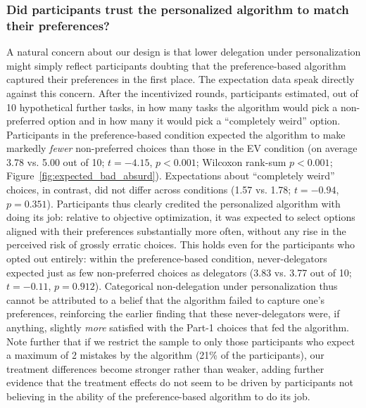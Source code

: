 \documentclass[a4paper, 12pt, fleqn]{article}
\theoremstyle{definition}
\begin{document}
\subsubsection*{Did participants trust the personalized algorithm to match their preferences?}
A natural concern about our design is that lower delegation under personalization might simply reflect participants doubting that the preference-based algorithm captured their preferences in the first place. The expectation data speak directly against this concern. After the incentivized rounds, participants estimated, out of 10 hypothetical further tasks, in how many tasks the algorithm would pick a non-preferred option and in how many it would pick a ``completely weird'' option. Participants in the preference-based condition expected the algorithm to make markedly \emph{fewer} non-preferred choices than those in the EV condition (on average 3.78 vs. 5.00 out of 10; $t = -4.15$, $p < 0.001$; Wilcoxon rank-sum $p < 0.001$; Figure~\ref{fig:expected_bad_absurd}). Expectations about ``completely weird'' choices, in contrast, did not differ across conditions (1.57 vs. 1.78; $t = -0.94$, $p = 0.351$). Participants thus clearly credited the personalized algorithm with doing its job: relative to objective optimization, it was expected to select options aligned with their preferences substantially more often, without any rise in the perceived risk of grossly erratic choices. This holds even for the participants who opted out entirely: within the preference-based condition, never-delegators expected just as few non-preferred choices as delegators (3.83 vs. 3.77 out of 10; $t = -0.11$, $p = 0.912$). Categorical non-delegation under personalization thus cannot be attributed to a belief that the algorithm failed to capture one's preferences, reinforcing the earlier finding that these never-delegators were, if anything, slightly \emph{more} satisfied with the Part-1 choices that fed the algorithm. Note further that if we restrict the sample to only those participants who expect a maximum of 2 mistakes by the algorithm (21\% of the participants), our treatment differences become stronger rather than weaker, adding further evidence that the treatment effects do not seem to be driven by participants not believing in the ability of the preference-based algorithm to do its job.
\end{document}
